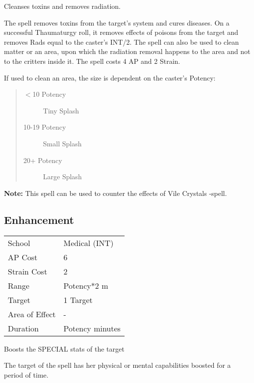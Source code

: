 \documentclass[11pt,a4paper,twocolumn]{book}
\begin{document}
\medskip

Cleanses toxins and removes radiation.

The spell removes toxins from the target's system and cures diseases. On a successful Thaumaturgy roll, it removes effects of poisons from the target and removes Rads equal to the caster's INT/2. The spell can also be used to clean matter or an area, upon which the radiation removal happens to the area and not to the critters inside it.
The spell costs 4 AP and 2 Strain.

If used to clean an area, the size is dependent on the caster's Potency:

\begin{quote}
	\begin{description}
		\item[$<$10 Potency] 	Tiny Splash
		\item[10-19 Potency] 	Small Splash
		\item[20+ Potency] 	Large Splash
	\end{description}
\end{quote}

\textbf{Note:} This spell can be used to counter the effects of Vile Crystals -spell.


\subsection*{Enhancement}
{
	\begin{tabu} to 75mm{| X[l,4] | X[l,7] |}
		\hline
		School 			& Medical (INT) 		\\
		AP Cost	      	& 6 					\\
		Strain Cost     & 2 					\\
		Range     		& Potency*2 m			\\
		Target      	& 1 Target				\\
		Area of Effect  & -  	 				\\
		Duration     	& Potency minutes 		\\ \hline
	\end{tabu}
	
}

\medskip

Boosts the SPECIAL stats of the target

The target of the spell has her physical or mental capabilities boosted for a period of time.
\end{document}
